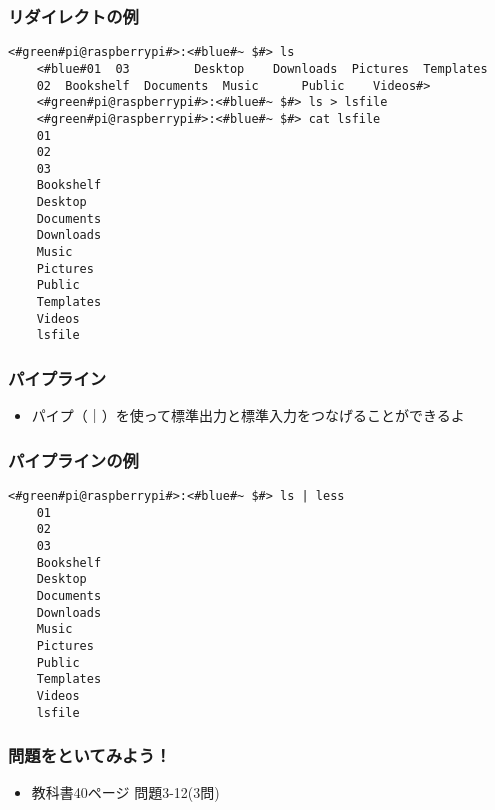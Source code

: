\begin{frame}[fragile]
    \frametitle{リダイレクトの例}
    \begin{lstlisting}[title=lsの出力をリダイレクトする, label=redirectLs]
    <#green#pi@raspberrypi#>:<#blue#~ $#> ls 
    <#blue#01  03         Desktop    Downloads  Pictures  Templates
    02  Bookshelf  Documents  Music      Public    Videos#>
    <#green#pi@raspberrypi#>:<#blue#~ $#> ls > lsfile
    <#green#pi@raspberrypi#>:<#blue#~ $#> cat lsfile
    01
    02
    03
    Bookshelf
    Desktop
    Documents
    Downloads
    Music
    Pictures
    Public
    Templates
    Videos
    lsfile
    \end{lstlisting}
\end{frame}

\begin{frame}
    \frametitle{パイプライン}
    \begin{itemize}
        \item パイプ（｜）を使って標準出力と標準入力をつなげることができるよ
    \end{itemize}
    \begin{figure}
        \centering
        
    \end{figure}
\end{frame}

\begin{frame}[fragile]
    \frametitle{パイプラインの例}
    \begin{lstlisting}[title=lsコマンドの出力をパイプでlessコマンドに渡す, label=redirectCat]
    <#green#pi@raspberrypi#>:<#blue#~ $#> ls | less
    01
    02
    03
    Bookshelf
    Desktop
    Documents
    Downloads
    Music
    Pictures
    Public
    Templates
    Videos
    lsfile
    \end{lstlisting}
\end{frame}

\begin{frame}
    \frametitle{問題をといてみよう！}
    \begin{itemize}
        \item 教科書40ページ 問題3-12(3問)
    \end{itemize}
\end{frame}

